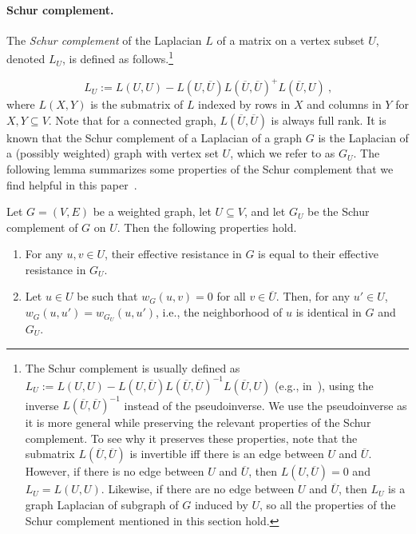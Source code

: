 \paragraph{Schur complement.} The \emph{Schur complement} of the Laplacian $L$ of a matrix on a vertex subset $U$, denoted $L_U$, is defined as follows.\footnote{The Schur complement is usually defined as $L_U := L(U, U) - L(U,\overline{U})L(\overline{U}, \overline{U})^{-1}L(\overline{U}, U)$ (e.g., in~\citep[Lemma 11.5.3]{spielman2019sagt}), using the inverse $L(\overline{U}, \overline{U})^{-1}$ instead of the pseudoinverse. We use the pseudoinverse as it is more general while preserving the relevant properties of the Schur complement. To see why it preserves these properties, note that the submatrix $L(\overline{U}, \overline{U})$ is invertible iff there is an edge between $U$ and $\overline{U}$. However, if there is no edge between $U$ and $\overline{U}$, then $L(U,\overline{U})=0$ and $L_U = L(U,U)$. Likewise, if there are no edge between $U$ and $\overline{U}$, then $L_U$ is a graph Laplacian of subgraph of $G$ induced by $U$, so all the properties of the Schur complement mentioned in this section hold.}

\begin{equation}
\label{eqn:schur_comp}
L_U := L(U, U) - L(U,\overline{U})L(\overline{U}, \overline{U})^+L(\overline{U}, U) \ \text{,}
\end{equation}
where $L(X,Y)$ is the submatrix of $L$ indexed by rows in $X$ and columns in $Y$ for $X, Y \subseteq V$. 
Note that for a connected graph, $L(\overline{U},\overline{U})$ is always full rank.
It is known that the Schur complement of a Laplacian of a graph $G$ is the Laplacian of a (possibly weighted) graph with vertex set $U$, which we refer to as $G_U$.  The following lemma summarizes some properties of the Schur complement that we find helpful in this paper~\citep{spielman2019sagt}.
\begin{lemma}
\label{lem:schur_comp_basics}
Let $G=(V,E)$ be a weighted graph, let $U\subseteq V$, and let $G_U$ be the Schur complement of $G$ on $U$.  Then the following properties hold.
\begin{enumerate}[(1)]
    \item For any $u,v\in U$, their effective resistance in $G$ is equal to their effective resistance in $G_U$.

    \item Let $u\in U$ be such that $w_G(u,v) = 0$ for all $v \in \overline{U}$. Then, for any $u'\in U$, $w_G(u,u') = w_{G_U}(u,u')$, i.e., the neighborhood of $u$ is identical in $G$ and $G_U$.
\end{enumerate}
\end{lemma}

